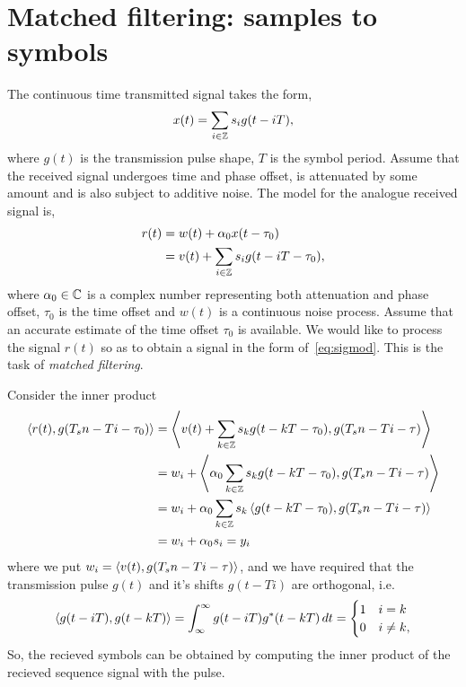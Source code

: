 \documentclass[a4paper,10pt]{article}
\begin{document}



\appendix

\section{Matched filtering: samples to symbols}

The continuous time transmitted signal takes the form,
\[
x(t) = \sum_{i \in {\mathbb Z}} s_i g(t - iT),
\]
where $g(t)$ is the transmission pulse shape, $T$ is the symbol period.  Assume that the received signal undergoes time and phase offset, is attenuated by some amount and is also subject to additive noise.  The model for the analogue received signal is,
\begin{align*}
r(t) &=  w(t) + \alpha_0 x(t - \tau_0) \\
&= v(t) + \sum_{i \in {\mathbb Z}} s_i g(t - iT - \tau_0),
\end{align*}
where $\alpha_0 \in {\mathbb C}$ is a complex number representing both attenuation and phase offset, $\tau_0$ is the time offset and $w(t)$ is a continuous noise process.  Assume that an accurate estimate of the time offset $\tau_0$ is available.  We would like to process the signal $r(t)$ so as to obtain a signal in the form of~\eqref{eq:sigmod}.  This is the task of \emph{matched filtering}.

Consider the inner product
\begin{align*}
\left\langle r(t) , g(T_sn - Ti -  \tau_0) \right\rangle &= \left\langle v(t) + \sum_{k \in {\mathbb Z}} s_k g(t - kT - \tau_0) , g(T_sn - Ti - \tau) \right\rangle  \\
&= w_i +  \left\langle \alpha_0 \sum_{k \in {\mathbb Z}} s_k g(t - kT - \tau_0) , g(T_sn - Ti - \tau) \right\rangle \\
&= w_i +  \alpha_0 \sum_{k \in {\mathbb Z}} s_k \left\langle  g(t - kT - \tau_0) , g(T_sn - Ti - \tau) \right\rangle \\
&= w_i + \alpha_0s_i = y_i
\end{align*}
where we put $w_i = \left\langle v(t) , g(T_sn - Ti - \tau) \right\rangle$, and we have required that the transmission pulse $g(t)$ and it's shifts $g(t - Ti)$ are orthogonal, i.e.
\begin{equation}
\left\langle g(t - iT) , g(t - kT) \right\rangle = \int_{\infty}^{\infty} g(t - iT)g^*(t-kT) \, dt = \begin{cases} 1 & i=k \\ 0 & i \neq k, \end{cases} \label{eq:contorthpulse}
\end{equation}
So, the recieved symbols can be obtained by computing the inner product of the recieved sequence signal with the pulse.
\end{document}
